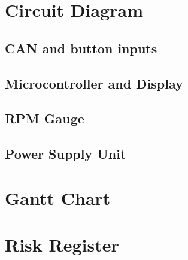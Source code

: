 \documentclass[a4paper,12pt]{article}
\begin{document}
\begin{appendices}

\section{Circuit Diagram}
\label{app:circuit_diagram}

\subsection{CAN and button inputs}
\label{app:can}


\subsection{Microcontroller and Display}
\label{app:microcontroller}


\subsection{RPM Gauge}
\label{app:leds}


\subsection{Power Supply Unit}
\label{app:psu}


\section{Gantt Chart}
\label{app:gantt_chart}
\vspace{-2.5cm}


\section{Risk Register}
\label{app:risk_register}


\end{appendices}

\end{document}
